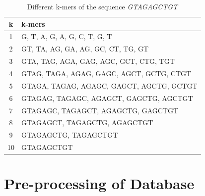 \documentclass[12pt, a4paper]{report}
\begin{document}
\begin{table}[H]
    \centering
    \renewcommand{\arraystretch}{1.4}
    \begin{tabular}{|c|l|}
        \hline
        \textbf{k}   &   \textbf{k-mers} \\\hline
        1   &   G, T, A, G, A, G, C, T, G, T    \\\hline
        2	&   GT, TA, AG, GA, AG, GC, CT, TG, GT  \\\hline
        3	&   GTA, TAG, AGA, GAG, AGC, GCT, CTG, TGT  \\\hline
        4	&   GTAG, TAGA, AGAG, GAGC, AGCT, GCTG, CTGT    \\\hline
        5	&   GTAGA, TAGAG, AGAGC, GAGCT, AGCTG, GCTGT    \\\hline
        6	&   GTAGAG, TAGAGC, AGAGCT, GAGCTG, AGCTGT  \\\hline
        7	&   GTAGAGC, TAGAGCT, AGAGCTG, GAGCTGT  \\\hline
        8	&   GTAGAGCT, TAGAGCTG, AGAGCTGT    \\\hline
        9	&   GTAGAGCTG, TAGAGCTGT    \\\hline
        10	&   GTAGAGCTGT  \\\hline
    \end{tabular}
    \caption{Different k-mers of the sequence \textit{GTAGAGCTGT}}
\end{table}

\section{Pre-processing of Database}
\end{document}
